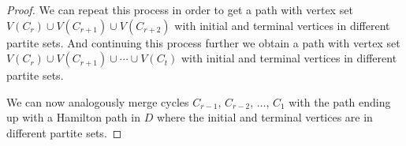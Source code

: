 \documentclass[10pt,a4paper]{amsart}
\begin{document}
\begin{proof}
We can repeat this process in order to get a path with vertex set $V(C_r) \cup V(C_{r+1}) \cup V(C_{r+2})$ with  initial and terminal vertices in different partite sets.
And continuing this process further we obtain a path with vertex set $V(C_r) \cup V(C_{r+1}) \cup \cdots \cup V(C_t)$ with  initial and terminal vertices in different partite sets.

We can now analogously merge cycles $C_{r-1}$, $C_{r-2}$, $\ldots$, $C_1$ with the path ending up with a Hamilton path in $D$ where the initial and terminal vertices are in different partite sets.
\end{proof}
\end{document}
